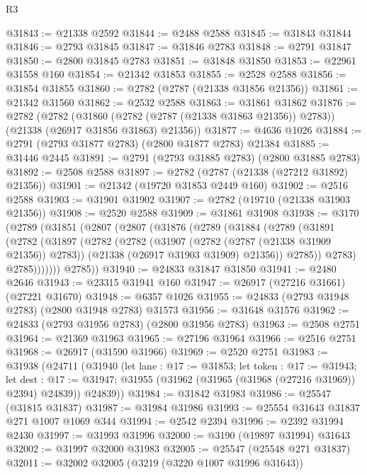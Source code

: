 \begin{lexlean}{R3}
\begin{coremodule}
@31843 := @21338 @2592
@31844 := @2488 @2588
@31845 := @31843 @31844
@31846 := @2793 @31845
@31847 := @31846 @2783
@31848 := @2791 @31847
@31850 := @2800 @31845 @2783
@31851 := @31848 @31850
@31853 := @22961 @31558 @160
@31854 := @21342 @31853
@31855 := @2528 @2588
@31856 := @31854 @31855
@31860 := @2782 (@2787 (@21338 @31856 @21356))
@31861 := @21342 @31560
@31862 := @2532 @2588
@31863 := @31861 @31862
@31876 := @2782
    (@2782
      (@31860 (@2782 (@2787 (@21338 @31863 @21356)) @2783))
      (@21338 (@26917 @31856 @31863) @21356))
@31877 := @4636 @1026
@31884 := @2791 (@2793 @31877 @2783) (@2800 @31877 @2783) @21384
@31885 := @31446 @2445
@31891 := @2791 (@2793 @31885 @2783) (@2800 @31885 @2783)
@31892 := @2508 @2588
@31897 := @2782 (@2787 (@21338 (@27212 @31892) @21356))
@31901 := @21342 (@19720 @31853 @2449 @160)
@31902 := @2516 @2588
@31903 := @31901 @31902
@31907 := @2782 (@19710 (@21338 @31903 @21356))
@31908 := @2520 @2588
@31909 := @31861 @31908
@31938 := @3170
    (@2789
      (@31851
        (@2807
          (@2807
            (@31876
              (@2789
                (@31884
                  (@2789
                    (@31891
                      (@2782
                        (@31897
                          (@2782
                            (@2782
                              (@31907 (@2782 (@2787 (@21338 @31909 @21356)) @2783))
                              (@21338 (@26917 @31903 @31909) @21356))
                            @2785))
                        @2783)
                      @2785)))))))
        @2785))
@31940 := @24833 @31847 @31850
@31941 := @2480 @2646
@31943 := @23315 @31941 @160
@31947 := @26917 (@27216 @31661) (@27221 @31670)
@31948 := @6357 @1026
@31955 := @24833 (@2793 @31948 @2783) (@2800 @31948 @2783) @31573
@31956 := @31648 @31576
@31962 := @24833 (@2793 @31956 @2783) (@2800 @31956 @2783)
@31963 := @2508 @2751
@31964 := @21369 @31963
@31965 := @27196 @31964
@31966 := @2516 @2751
@31968 := @26917 (@31590 @31966)
@31969 := @2520 @2751
@31983 := @31938
    (@24711
      (@31940
        (let lane : @17 := @31853;
        let token : @17 := @31943;
        let dest : @17 := @31947; @31955 (@31962 (@31965 (@31968 (@27216 @31969)) @2394) @24839))
        @24839))
@31984 := @31842 @31983
@31986 := @25547 (@31815 @31837)
@31987 := @31984 @31986
@31993 := @25554 @31643 @31837 @271 @1007 @1069 @344
@31994 := @2542 @2394
@31996 := @2392 @31994 @2430
@31997 := @31993 @31996
@32000 := @3190 (@19897 @31994) @31643
@32002 := @31997 @32000 @31983
@32005 := @25547 (@25548 @271 @31837)
@32011 := @32002 @32005 (@3219 (@3220 @1007 @31996 @31643))

\end{coremodule}
\end{lexlean}
